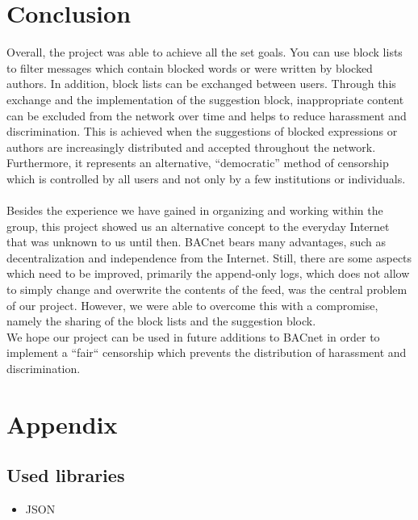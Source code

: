 \documentclass[12pt]{article}
\begin{document}
\section{Conclusion}
Overall, the project was able to achieve all the set goals. You can use block lists to filter messages which contain blocked words or were written by blocked authors. In addition, block lists can be exchanged between users. Through this exchange and the implementation of the suggestion block, inappropriate content can be excluded from the network over time and helps to reduce harassment and discrimination. This is achieved when the suggestions of blocked expressions or authors are increasingly distributed and accepted throughout the network. Furthermore, it represents an alternative, “democratic” method of censorship which is controlled by all users and not only by a few institutions or individuals.\\
\\
Besides the experience we have gained in organizing and working within the group, this project showed us an alternative concept to the everyday Internet that was unknown to us until then. BACnet bears many advantages, such as decentralization and independence from the Internet. 
Still, there are some aspects which need to be improved, primarily the append-only logs, which does not allow to simply change and overwrite the contents of the feed, was the central problem of our project. However, we were able to overcome this with a compromise, namely the sharing of the block lists and the suggestion block.\\
We hope our project can be used in future additions to BACnet in order to implement a “fair“ censorship which prevents the distribution of harassment  and discrimination.



\section{Appendix}
\subsection{Used libraries}
\begin{itemize}
  \item JSON
\end{itemize}
\end{document}

